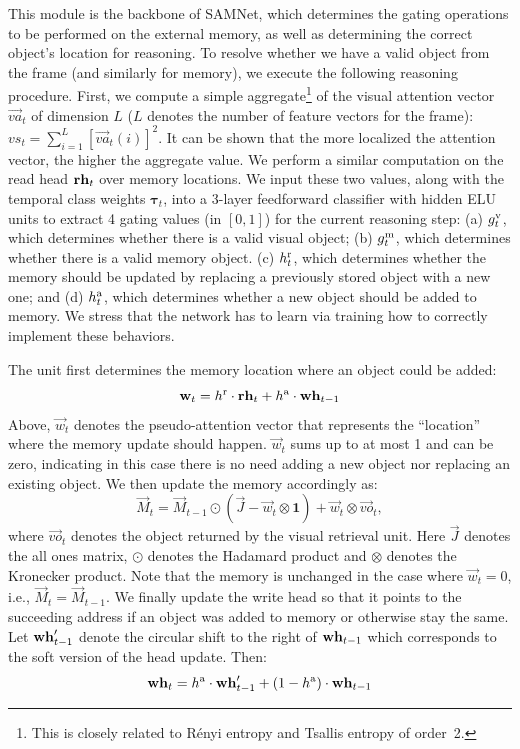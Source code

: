 This module is the backbone of SAMNet, which determines the gating operations to be performed on the external memory, as well as determining the correct object's location for reasoning.
To resolve whether we have a valid object from the frame (and similarly for memory), we execute the following reasoning procedure.
First, we compute a simple aggregate\footnote{%
	This is closely related to R\'{e}nyi entropy and Tsallis entropy of order~2.} of the visual attention vector $\vec{va}_t$ of dimension $L$ ($L$ denotes the number of feature vectors for the frame):
$vs_t = \sum_{i=1}^L [\vec{va}_t(i)]^2$. It can be shown that the more localized the attention
vector, the higher the aggregate value.
We perform a similar computation on the read head $\mathbf{rh}_t$ over memory locations.
We input these two values, along with the temporal class weights $\bm{\tau}_t$, into a 3-layer feedforward classifier with hidden ELU units to extract 4 gating values (in $[0,1]$) for the current reasoning step:
(a) $g^{\mathrm{v}}_t$, which determines whether there is a valid visual object;
(b) $g^{\mathrm{m}}_t$, which determines whether there is a valid memory object.
(c) $h^{\mathrm{r}}_t$, which determines whether the memory should be updated by replacing a previously stored object with a new one; and
(d) $h^{\mathrm{a}}_t$, which determines whether a new object should be added to memory.
We stress that the network has to learn via training how to correctly implement these behaviors.

The unit first determines the memory location where an object could be added:
\[ \mathbf{w}_t = h^{\mathrm{r}} \cdot \mathbf{rh}_t + h^{\mathrm{a}} \cdot \mathbf{wh}_{t-1} \]
Above, $\vec{w}_t$ denotes the pseudo-attention vector that represents the ``location'' where the memory update should happen.
$\vec{w}_t$ sums up to at most 1 and can be zero, indicating in this case there is no need adding a new object nor replacing an existing object.
We then update the memory accordingly as:
\[ \vec{M}_t = \vec{M}_{t-1} \odot (\vec{J} - \vec{w}_t  \otimes \mathbf{1}) + \vec{w}_t  \otimes \vec{vo}_t,\]
where $\vec{vo}_t$ denotes the object returned by the visual retrieval unit.
Here $\vec{J}$ denotes the all ones matrix, $\odot$ denotes the Hadamard product and $\otimes$ denotes the Kronecker product.
Note that the memory is unchanged in the case where $\vec{w}_t = 0$, i.e., $\vec{M}_t = \vec{M}_{t-1}$.
We finally update the write head so that it points to the succeeding address if an object was added to memory or otherwise stay the same.
Let $\mathbf{wh}'_{t-1}$ denote the circular shift to the right of $\mathbf{wh}_{t-1}$ which corresponds to the soft version of the head update.
Then:
\[ \mathbf{wh}_t = h^{\mathrm{a}} \cdot \mathbf{wh}'_{t-1} + (1-h^{\mathrm{a}}) \cdot \mathbf{wh}_{t-1} \]

